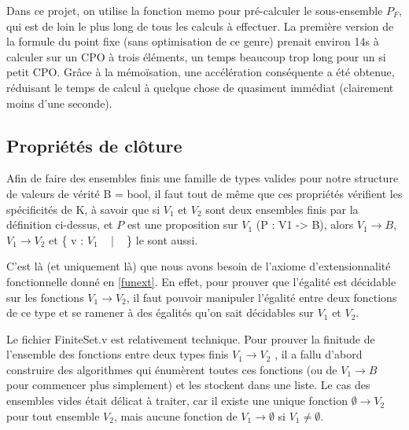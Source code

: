 \documentclass{article}
\newcommand\code[1]{{\fontfamily{lmtt}\selectfont #1}}
\theoremstyle{definition}
\begin{document}
 Dans ce projet, on utilise la fonction \code{memo} pour pré-calculer le sous-ensemble $P_F$, qui est de loin le plus long de tous les calculs à effectuer. La première version de la formule du point fixe (sans optimisation de ce genre) prenait environ 14s à calculer sur un CPO à trois éléments, un temps beaucoup trop long pour un si petit CPO. Grâce à la mémoïsation, une accélération conséquente a été obtenue, réduisant le temps de calcul à quelque chose de quasiment immédiat (clairement moins d'une seconde).


\subsection{Propriétés de clôture}
\label{cloture}

Afin de faire des ensembles finis une famille de types valides pour notre structure de valeurs de vérité \code{B = bool}, il faut tout de même que ces propriétés vérifient les spécificités de \code{K}, à savoir que si $V_1$ et $V_2$ sont deux ensembles finis par la définition ci-dessus, et $P$ est une proposition sur $V_1$ (\code{P : V1 -> B}), alors $V_1 \rightarrow B$, $V_1 \rightarrow V_2$ et
\{ v : $V_1$ ~ | ~ \text{\code{is\_true(P v)}} \} le sont aussi.

C'est là (et uniquement là) que nous avons besoin de l'axiome d'extensionnalité fonctionnelle donné en \ref{funext}. En effet, pour prouver que l'égalité est décidable sur les fonctions $V_1 \rightarrow V_2$, il faut pouvoir manipuler l'égalité entre deux fonctions de ce type et se ramener à des égalités qu'on sait décidables sur $V_1$ et $V_2$. %

\medskip

Le fichier \code{FiniteSet.v} est relativement technique. Pour prouver la finitude de l'ensemble des fonctions entre deux types finis $V_1 \rightarrow V_2$ , il a fallu d'abord construire des algorithmes qui énumèrent toutes ces fonctions (ou de $V_1 \rightarrow B$ pour commencer plus simplement) et les stockent dans une liste. Le cas des ensembles vides était délicat à traiter, car il existe une unique fonction $\emptyset \rightarrow V_2$ pour tout ensemble $V_2$, mais aucune fonction de $V_1 \rightarrow \emptyset$ si $V_1 \neq \emptyset$.

\end{document}
